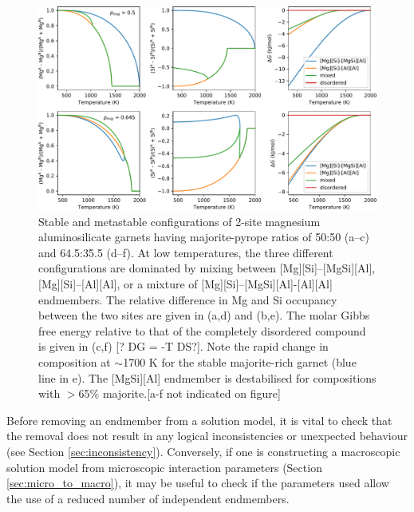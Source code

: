 \documentclass[preprint,12pt]{elsarticle}
\begin{document}
\begin{figure}[htb!]
  \centering
  \includegraphics[width=\textwidth]{figures/py_maj_configurations_edited2.pdf}
  \caption{Stable and metastable configurations of 2-site magnesium aluminosilicate garnets having majorite-pyrope ratios of 50:50 (a--c) and 64.5:35.5 (d--f). At low temperatures, the three different configurations are dominated by mixing between [Mg][Si]--[MgSi][Al], [Mg][Si]--[Al][Al], or a mixture of [Mg][Si]--[MgSi][Al]-[Al][Al] endmembers. The relative difference in Mg and Si occupancy between the two sites are given in (a,d) and (b,e). The molar Gibbs free energy relative to that of the completely disordered compound is given in (c,f) [? DG = -T DS?]. Note the rapid change in composition at $\sim$1700 K for the stable majorite-rich garnet (blue line in e). The [MgSi][Al] endmember is destabilised for compositions with $>$65\% majorite.[a-f not indicated on figure] }
  \label{fig:pyrope_majorite_configurations}
\end{figure}

Before removing an endmember from a solution model, it is vital to check that the removal does not result in any logical inconsistencies or unexpected behaviour (see Section \ref{sec:inconsistency}). Conversely, if one is constructing a macroscopic solution model from microscopic interaction parameters (Section \ref{sec:micro_to_macro}), it may be useful to check if the parameters used allow the use of a reduced number of independent endmembers.
\end{document}
